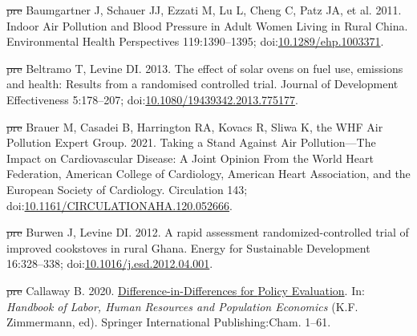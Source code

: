 \documentclass[
  letterpaper,
  DIV=11,
  numbers=noendperiod]{scrartcl}
\newlength{\cslhangindent}
\newenvironment{CSLReferences}[2] %
 {\begin{list}{}{%
  \setlength{\itemindent}{0pt} %
  \setlength{\leftmargin}{0pt} %
  \setlength{\parsep}{0pt} %
  \ifodd #1
   \setlength{\leftmargin}{\cslhangindent} %
   \setlength{\itemindent}{-1\cslhangindent} %
  \fi
  \setlength{\itemsep}{#2\baselineskip}}} %
 {\end{list}} %
\providecommand{\DIFdel}[1]{{\protect\color{red}\sout{#1}}}                      %
\providecommand{\DIFaddbegin}{} %
\providecommand{\DIFaddend}{} %
\providecommand{\DIFdelbegin}{} %
\providecommand{\DIFdelend}{} %
\newcommand{\DIFscaledelfig}{0.5}
\newlength{\DIFdelgraphicswidth} %
\newlength{\DIFdelgraphicsheight} %
\newcommand{\DIFaddincludegraphics}[2][]{{\color{blue}\fbox{\DIFOincludegraphics[#1]{#2}}}} %
\newcommand{\DIFdelincludegraphics}[2][]{%
\sbox{\DIFdelgraphicsbox}{\DIFOincludegraphics[#1]{#2}}%
\settoboxwidth{\DIFdelgraphicswidth}{\DIFdelgraphicsbox} %
\settoboxtotalheight{\DIFdelgraphicsheight}{\DIFdelgraphicsbox} %
\scalebox{\DIFscaledelfig}{%
\parbox[b]{\DIFdelgraphicswidth}{\usebox{\DIFdelgraphicsbox}\\[-\baselineskip] \rule{\DIFdelgraphicswidth}{0em}}\llap{\resizebox{\DIFdelgraphicswidth}{\DIFdelgraphicsheight}{%
\setlength{\unitlength}{\DIFdelgraphicswidth}%
\begin{picture}(1,1)%
\thicklines\linethickness{2pt} %
{\color[rgb]{1,0,0}\put(0,0){\framebox(1,1){}}}%
{\color[rgb]{1,0,0}\put(0,0){\line( 1,1){1}}}%
{\color[rgb]{1,0,0}\put(0,1){\line(1,-1){1}}}%
\end{picture}%
}\hspace*{3pt}}} %
} %
\DeclareRobustCommand{\DIFaddbegin}{\DIFOaddbegin \let\includegraphics\DIFaddincludegraphics} %
\DeclareRobustCommand{\DIFaddend}{\DIFOaddend \let\includegraphics\DIFOincludegraphics} %
\DeclareRobustCommand{\DIFdelbegin}{\DIFOdelbegin \let\includegraphics\DIFdelincludegraphics} %
\DeclareRobustCommand{\DIFdelend}{\DIFOaddend \let\includegraphics\DIFOincludegraphics} %
\begin{document}
\begin{CSLReferences}{1}{1}
\DIFdelbegin %
\DIFdel{pre}%
\DIFdelend \DIFaddbegin {}
\DIFaddend Baumgartner J, Schauer JJ, Ezzati M, Lu L, Cheng C, Patz JA, et al.
2011. Indoor {Air Pollution} and {Blood Pressure} in {Adult Women
Living} in {Rural China}. Environmental Health Perspectives
119:1390--1395;
doi:\href{https://doi.org/10.1289/ehp.1003371}{10.1289/ehp.1003371}.

\DIFdelbegin %
\DIFdel{pre}%
\DIFdelend \DIFaddbegin {}
\DIFaddend Beltramo T, Levine DI. 2013. The effect of solar ovens on fuel use,
emissions and health: Results from a randomised controlled trial.
Journal of Development Effectiveness 5:178--207;
doi:\href{https://doi.org/10.1080/19439342.2013.775177}{10.1080/19439342.2013.775177}.

\DIFdelbegin %
\DIFdel{pre}%
\DIFdelend \DIFaddbegin {}
\DIFaddend Brauer M, Casadei B, Harrington RA, Kovacs R, Sliwa K, the WHF Air
Pollution Expert Group. 2021. Taking a {Stand Against Air
Pollution}---{The Impact} on {Cardiovascular Disease}: {A Joint Opinion
From} the {World Heart Federation}, {American College} of {Cardiology},
{American Heart Association}, and the {European Society} of
{Cardiology}. Circulation 143;
doi:\href{https://doi.org/10.1161/CIRCULATIONAHA.120.052666}{10.1161/CIRCULATIONAHA.120.052666}.

\DIFdelbegin %
\DIFdel{pre}%
\DIFdelend \DIFaddbegin {}
\DIFaddend Burwen J, Levine DI. 2012. A rapid assessment randomized-controlled
trial of improved cookstoves in rural {Ghana}. Energy for Sustainable
Development 16:328--338;
doi:\href{https://doi.org/10.1016/j.esd.2012.04.001}{10.1016/j.esd.2012.04.001}.

\DIFdelbegin %
\DIFdel{pre}%
\DIFdelend \DIFaddbegin {}
\DIFaddend Callaway B. 2020.
\href{https://doi.org/10.1007/978-3-319-57365-6_352-1}{Difference-in-{Differences}
for {Policy Evaluation}}. In: \emph{Handbook of {Labor}, {Human
Resources} and {Population Economics}} (K.F. Zimmermann, ed). Springer
International Publishing:Cham. 1--61.


\end{CSLReferences}
\end{document}
